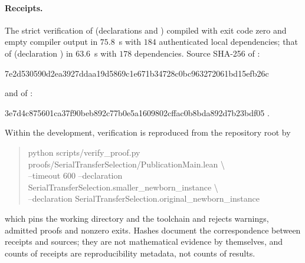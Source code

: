 \documentclass[11pt,a4paper]{article}
\theoremstyle{plain}
\theoremstyle{definition}
\theoremstyle{remark}
\begin{document}
\paragraph{Receipts.}
The strict verification of  (declarations  and ) compiled with exit code zero and empty compiler output in $75.8$~s with $184$ authenticated local dependencies; that of  (declaration ) in $63.6$~s with $178$ dependencies. Source SHA-256 of :
\begin{center}\footnotesize\ttfamily
7e2d530590d2ea3927ddaa19d5869c1e671b34728c0bc963272061bd15efb26c
\end{center}
and of :
\begin{center}\footnotesize\ttfamily
3e7d4c875601ca37f90beb892c77b0e5a1609802cffac0b8bda892d7b23bdf05 .
\end{center}
Within the development, verification is reproduced from the repository root by
\begin{quote}\scriptsize\ttfamily\raggedright
python scripts/verify\_proof.py proofs/SerialTransferSelection/PublicationMain.lean \textbackslash\\
\hspace*{2em}--timeout 600 --declaration SerialTransferSelection.smaller\_newborn\_instance \textbackslash\\
\hspace*{2em}--declaration SerialTransferSelection.original\_newborn\_instance
\end{quote}
which pins the working directory  and the toolchain and rejects warnings, admitted proofs and nonzero exits. Hashes document the correspondence between receipts and sources; they are not mathematical evidence by themselves, and counts of receipts are reproducibility metadata, not counts of results.
\end{document}
